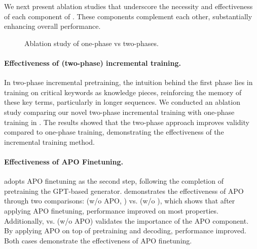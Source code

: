 We next present ablation studies that underscore the necessity and effectiveness of each component of \algname. These components complement each other, substantially enhancing overall performance.










\begin{wrapfigure}[9]{r}{.26\textwidth}
    \centering
\setlength{\tabcolsep}{4pt}
   \centering
{}
        \caption{Ablation study of one-phase vs two-phases. } 
        \label{tab:stage-ablation}
\end{wrapfigure}
\paragraph{Effectiveness of (two-phase) incremental training.}
In two-phase incremental pretraining, 
the intuition behind the first phase lies in training on critical keywords as knowledge pieces, reinforcing the memory of these key terms, particularly in longer sequences.
We conducted an ablation study comparing our novel two-phase incremental training with  one-phase training in .
The results showed that the two-phase approach improves validity compared to one-phase training, demonstrating the effectiveness of the incremental training method.




\paragraph{Effectiveness of APO Finetuning.} \algname adopts APO finetuning as the second step, following the completion of pretraining the GPT-based generator.  demonstrates the effectiveness of APO through two comparisons: \algname (w/o APO, \TOPN) vs. \algname (w/o \TOPN), which shows that after applying APO finetuning, performance improved on most properties. Additionally, \algname vs. \algname (w/o APO) validates the importance of the APO component. By applying APO on top of pretraining and \TOPN decoding, performance improved. Both cases demonstrate the effectiveness of APO finetuning. 


